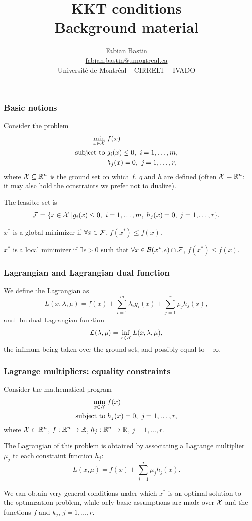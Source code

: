 \documentclass[usepdftitle=false,aspectratio=169]{beamer}
\author[Fabian Bastin]{Fabian Bastin \\ \texorpdfstring{\url{fabian.bastin@umontreal.ca}}{fabian.bastin@umontreal.ca} \\ Université de Montréal -- CIRRELT -- IVADO}
\date{}
\title[KKT conditions]{KKT conditions\\Background material}
\def\red{\color{red}}
\begin{document}
\frame{\titlepage}


\begin{frame}
\frametitle{Basic notions}

Consider the problem
\begin{align*}
	\min_{x \in {\mathcal{X}}} \ & f(x) \\
	\mbox{subject to } & g_i(x) \leq 0,\ i = 1,\ldots,m, \\
	& h_j(x) = 0,\ j = 1,\ldots,r,
\end{align*}
where ${\mathcal{X}} \subseteq {\mathbb{R}}^n$ is the {\red ground set} on which $f$, $g$ and $h$ are defined (often ${\mathcal{X}} = {\mathbb{R}}^n$; it may also hold the constraints we prefer not to dualize).

The {\red feasible set} is
$$
{\mathcal{F}} = \{ x \in {\mathcal{X}} \,|\, g_i(x) \leq 0,\ i = 1,\ldots,m,\ h_j(x) = 0,\ j = 1,\ldots,r \}.
$$

$x^*$ is a global minimizer if $\forall x \in {\mathcal{F}}$, $f(x^*) \leq f(x)$.

$x^*$ is a local minimizer if
$\exists \epsilon > 0$ such that $\forall x \in {\mathcal{B}}(x^*, \epsilon) \cap {\mathcal{F}}$, $f(x^*) \leq f(x).$

\end{frame}

\begin{frame}
	\frametitle{Lagrangian and Lagrangian dual function}
	
We define the Lagrangian as
	$$
	L(x, \lambda, \mu) = f(x) + \sum_{i = 1}^m \lambda_i g_i(x)
	+ \sum_{j = 1}^r \mu_j h_j(x),
	$$
and the dual Lagrangian function
	$$
	{\mathcal{L}}(\lambda, \mu) = \inf_{x \in {\mathcal{X}}} L(x, \lambda, \mu),
	$$
the infimum being taken over the ground set, and possibly equal to $-\infty$.
	
\end{frame}

\begin{frame}
\frametitle{Lagrange multipliers: equality constraints}

Consider the mathematical program
\begin{align*}
\min_{x \in {\mathcal{X}}} \ & f(x) \\
\mbox{subject to } & h_j(x) = 0,\ j = 1,\ldots,r,
\end{align*}
where ${\mathcal{X}} \subset {\mathbb{R}}^n$, $f: {\mathbb{R}}^n \rightarrow {\mathbb{R}}$, $h_j: {\mathbb{R}}^n \rightarrow {\mathbb{R}}$, $j = 1,\ldots,r$.

\mbox{}

The {\red Lagrangian} of this problem is obtained by associating a Lagrange multiplier $\mu_j$ to each constraint function $h_j$:
$$
L(x, \mu) = f(x) + \sum_{j = 1}^{r} \mu_j h_j(x).
$$

We can obtain very general conditions under which $x^*$ is an optimal solution to the optimization problem, while only basic assumptions are made over ${\mathcal{X}}$ and the functions $f$ and $h_j$, $j = 1,\ldots,r$.

\end{frame}
\end{document}
